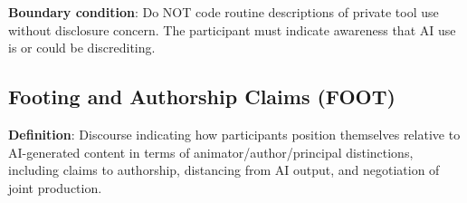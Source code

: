 \documentclass[11pt]{article}
\begin{document}
\begin{tcolorbox}[colback=stigmacolor!10, colframe=stigmacolor!80, title=\textbf{STIG: Stigma and Disclosure Management Codes}, fonttitle=\bfseries\sffamily]
\vspace{0.5em}
\textbf{Boundary condition}: Do NOT code routine descriptions of private tool use without disclosure concern. The participant must indicate awareness that AI use is or could be discrediting.
\end{tcolorbox}

\newpage
\subsection{Footing and Authorship Claims (FOOT)}

\begin{tcolorbox}[colback=footingcolor!10, colframe=footingcolor!80, title=\textbf{FOOT: Footing and Authorship Codes}, fonttitle=\bfseries\sffamily]

\textbf{Definition}: Discourse indicating how participants position themselves relative to AI-generated content in terms of animator/author/principal distinctions, including claims to authorship, distancing from AI output, and negotiation of joint production.


\end{tcolorbox}
\end{document}
